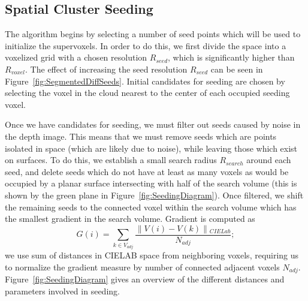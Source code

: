 \subsection{Spatial Cluster Seeding}
\label{subsec:Seeding}
The algorithm begins by selecting a number of seed points which will be used to initialize the supervoxels. In order to do this, we first divide the space into a voxelized grid with a chosen resolution ${R}_{seed}$, which is significantly higher than ${R}_{voxel}$. The effect of increasing the seed resolution ${R}_{seed}$ can be seen in Figure~\ref{fig:SegmentedDiffSeeds}. Initial candidates for seeding are chosen by selecting the voxel in the cloud nearest to the center of each occupied seeding voxel.    

Once we have candidates for seeding, we must filter out seeds caused by noise in the depth image. This means that we must remove seeds which are points isolated in space (which are likely due to noise), while leaving those which exist on surfaces. To do this, we establish a small search radius ${R}_{search}$ around each seed, and delete seeds which do not have at least as many voxels as would be occupied by a planar surface intersecting with half of the search volume (this is shown by the green plane in Figure~\ref{fig:SeedingDiagram}). Once filtered, we shift the remaining seeds to the connected voxel within the search volume which has the smallest gradient in the search volume. Gradient is computed as
\begin{equation} \label{eqn:Gradient}
\mathit{G}(i) = \sum_{k\in{V}_{adj}}{\frac{\parallel{V(i)-V(k)}\parallel{}_{CIELab}}{{N}_{adj}}};
\end{equation}
we use sum of distances in CIELAB space from neighboring voxels, requiring us to normalize the gradient measure by number of connected adjacent voxels ${N}_{adj}$. Figure~\ref{fig:SeedingDiagram} gives an overview of the different distances and parameters involved in seeding.

